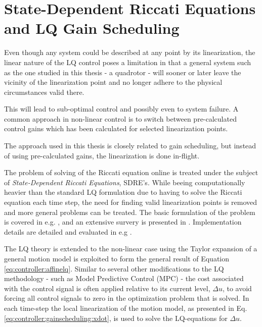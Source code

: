 \section{State-Dependent Riccati Equations and LQ Gain Scheduling}
\label{sec:controller:gainscheduling}
    Even though any system could be described at any point by its linearization,
    the linear nature of the LQ control poses a limitation in that
    a general system such as the one studied in this thesis - a quadrotor - will
    sooner or later leave the vicinity of the linearization point and no
    longer adhere to the physical circumstances valid there.

    This will lead to sub-optimal control and possibly even to system failure.
    A common approach in non-linear control is to switch between pre-calculated
    control gains which has been calculated for selected linearization points.

    The approach used in this thesis is closely related to gain scheduling,
    but instead of using pre-calculated gains, the linearization is done
    in-flight.

    The problem of solving of the Riccati equation  online is treated under
    the subject of \textit{State-Dependent Riccati Equations}, SDRE's.
    While beeing computationally heavier than the standard LQ formulation
    due to having to solve the Riccati equation each time step, the need
    for finding valid linearization points is removed and more general problems can be treated.
    The basic formulation of the problem is covered in e.g. \citep{Rantzer99piecewiselinear},
    and an extensive survery is presented in \citep{Tayfun08sdresurvey}.
    Implementation details are detailed and evaluated in e.g \citep{Erdem_analysisand,Benner98acceleratingnewton's,10.1109/MED.2006.328740}.

    The LQ theory is extended to the non-linear case using the Taylor
    expansion of a general motion model is exploited to form the general
    result of Equation \eqref{eq:controller:affinelq}.
    Similar to several other modifications to the LQ methodology - such as
    Model Predictive Control (MPC) - the cost associated with the control signal
    is often applied relative to its current level, $\Delta u$, to avoid
    forcing all control signals to zero in the optimization problem that is solved.
    In each time-step the local linearization of the motion model, as presented in
    Eq. \eqref{eq:controller:gainscheduling:xdot}, is used to solve the LQ-equations for $\Delta u$.

